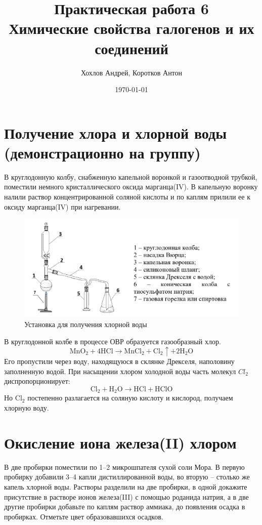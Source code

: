 \documentclass[a4paper,12pt]{article}
\author{Хохлов Андрей, Коротков Антон}
\title{Практическая работа 6 \\
	\textbf{Химические свойства галогенов и их соединений}}
\date{\today}
\begin{document}
	
	{\Large \maketitle}
\section{Получение хлора и хлорной воды (демонстрационно на группу)}	
В круглодонную колбу, снабженную капельной воронкой и газоотводной трубкой, поместили
немного кристаллического оксида марганца(IV). В капельную воронку налили раствор
концентрированной соляной кислоты и по каплям прилили ее к оксиду марганца(IV) при
нагревании. 
\begin{figure}[h]

\centering

\includegraphics[scale=1.1]{1.png}

\caption{Установка для получения хлорной воды}

\label{fig:mpr}
\end{figure}
В круглодонной колбе в процессе ОВР образуется газообразный хлор. 
\begin{equation} 
\mathrm{MnO_2+4HCl \longrightarrow MnCl_2 + Cl_2\uparrow + 2H_2O } 
\end{equation}
Его пропустили через воду, находящуюся в склянке Дрекселя, наполовину заполненную водой.
При насыщении хлором холодной воды часть молекул $Cl_2$ диспропорционирует:
\begin{equation} 
\mathrm{Cl_2 + H_2O\longrightarrow HCl + HClO} 
\end{equation}
Но $\mathrm{Cl_2}$ постепенно разлагается на соляную кислоту и кислород, получаем хлорную воду.
\section{Окисление иона железа(II) хлором}
В две пробирки поместили по 1–2 микрошпателя сухой соли Мора. В первую пробирку
добавили 3–4 капли дистиллированной воды, во вторую – столько же капель хлорной воды.
Растворы разделили на две пробирки, в одной докажите присутствие в растворе ионов железа(III) с
помощью роданида натрия, а в две другие пробирки добавьте по каплям раствор аммиака, до
появления осадка в пробирках. Отметьте цвет образовавшихся осадков.
\end{document}
